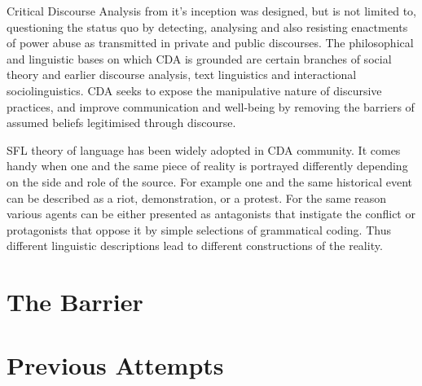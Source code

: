 Critical Discourse Analysis from it's inception was designed, but is not limited to, questioning the status quo by detecting, analysing and also resisting enactments of power abuse as transmitted in private and public discourses. The philosophical and linguistic bases on which CDA is grounded are certain branches of social theory and earlier discourse analysis, text linguistics and interactional sociolinguistics. CDA seeks to expose the manipulative nature of discursive practices, and improve communication and well-being by removing the barriers of assumed beliefs legitimised through discourse\citep{Tenorio2011}. 

SFL theory of language has been widely adopted in CDA community. It comes handy when one and the same piece of reality is portrayed differently depending on the side and role of the source. For example one and the same historical event can be described as a riot, demonstration, or a protest. For the same reason various agents can be either presented as antagonists that instigate the conflict or protagonists that oppose it by simple selections of grammatical coding. Thus different linguistic descriptions lead to different constructions of the reality. 



\section{The Barrier}


\section{Previous Attempts}


